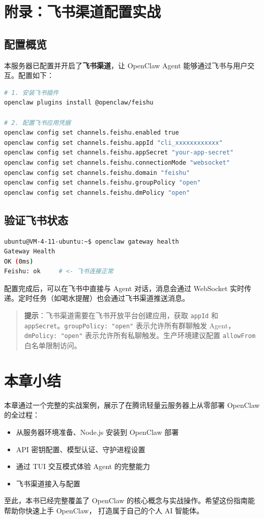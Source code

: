 \clearpage

\section{附录：飞书渠道配置实战}

\subsection{配置概览}

本服务器已配置并开启了\textbf{飞书渠道}，让 OpenClaw Agent 能够通过飞书与用户交互。配置如下：

\begin{lstlisting}[language=bash]
# 1. 安装飞书插件
openclaw plugins install @openclaw/feishu

# 2. 配置飞书应用凭据
openclaw config set channels.feishu.enabled true
openclaw config set channels.feishu.appId "cli_xxxxxxxxxxxx"
openclaw config set channels.feishu.appSecret "your-app-secret"
openclaw config set channels.feishu.connectionMode "websocket"
openclaw config set channels.feishu.domain "feishu"
openclaw config set channels.feishu.groupPolicy "open"
openclaw config set channels.feishu.dmPolicy "open"
\end{lstlisting}

\subsection{验证飞书状态}

\begin{lstlisting}[language=bash]
ubuntu@VM-4-11-ubuntu:~$ openclaw gateway health
Gateway Health
OK (0ms)
Feishu: ok     # <- 飞书连接正常
\end{lstlisting}

配置完成后，可以在飞书中直接与 Agent 对话，消息会通过 WebSocket 实时传递。定时任务（如喝水提醒）也会通过飞书渠道推送消息。

\begin{quote}
\textbf{提示}：飞书渠道需要在飞书开放平台创建应用，获取 \texttt{appId} 和 \texttt{appSecret}。\texttt{groupPolicy: "open"} 表示允许所有群聊触发 Agent，\texttt{dmPolicy: "open"} 表示允许所有私聊触发。生产环境建议配置 \texttt{allowFrom} 白名单限制访问。
\end{quote}

\section{本章小结}

本章通过一个完整的实战案例，展示了在腾讯轻量云服务器上从零部署 OpenClaw 的全过程：

\begin{itemize}
  \item 从服务器环境准备、Node.js 安装到 OpenClaw 部署
  \item API 密钥配置、模型认证、守护进程设置
  \item 通过 TUI 交互模式体验 Agent 的完整能力
  \item 飞书渠道接入与配置
\end{itemize}

\noindent 至此，本书已经完整覆盖了 OpenClaw 的核心概念与实战操作。希望这份指南能帮助你快速上手 OpenClaw，
打造属于自己的个人 AI 智能体。
